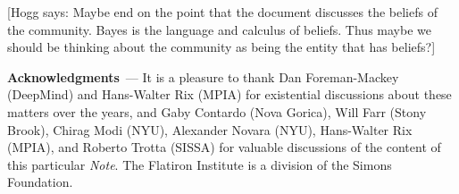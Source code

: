 \documentclass{article}
\renewcommand{\paragraph}[1]{\bigskip\par\noindent\textbf{#1}~---}
\newcommand{\documentname}{\textsl{Note}}
\newcommand{\hogg}[1]{{\color{blue}[Hogg says: {#1}]}}
\begin{document}
\hogg{Maybe end on the point that the document discusses the beliefs of the community.
Bayes is the language and calculus of beliefs.
Thus maybe we should be thinking about the community as being the entity that has beliefs?}

\paragraph{Acknowledgments}
It is a pleasure to thank
  Dan Foreman-Mackey (DeepMind) and
  Hans-Walter Rix (MPIA)
for existential discussions about these matters over the years, and
  Gaby Contardo (Nova Gorica),
  Will Farr (Stony Brook),
  Chirag Modi (NYU),
  Alexander Novara (NYU),
  Hans-Walter Rix (MPIA), and
  Roberto Trotta (SISSA)
for valuable discussions of the content of this particular \documentname.
The Flatiron Institute is a division of the Simons Foundation.

\raggedright\footnotesize


\end{document}
